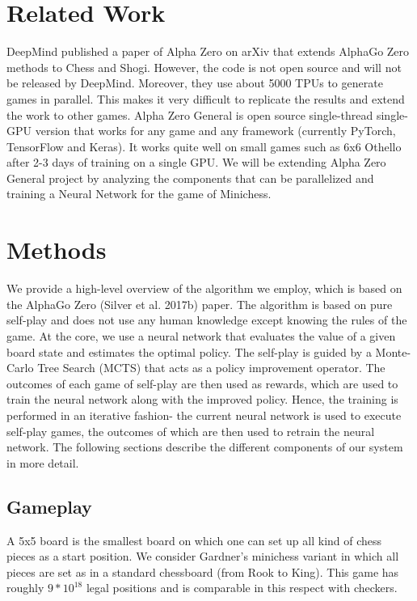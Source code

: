\documentclass[11pt]{article}
\begin{document}
\section{Related Work}

DeepMind published a ​paper​ of Alpha Zero on arXiv that extends AlphaGo Zero methods to Chess and Shogi. However, the code is not open source and will not be released by DeepMind. Moreover, they use about 5000 TPUs to generate games in parallel. This makes it very difficult to replicate the results and extend the work to other games. ​Alpha Zero General​ is open source single-thread single-GPU version that works for any game and any framework (currently PyTorch, TensorFlow and Keras). It works quite well on small games such as 6x6 Othello after ​2-3 days of training on a single GPU​. We will be extending Alpha Zero General project by analyzing the components that can be parallelized and training a Neural Network for the game of Minichess. 


\section{Methods}

We provide a high-level overview of the algorithm we employ, which is based on the AlphaGo Zero (Silver et al. 2017b) paper. The algorithm is based on pure self-play and does not use any human knowledge except knowing the rules of the game. At the core, we use a neural network that evaluates the value of a given board state and estimates the optimal policy. The self-play is guided by a Monte-Carlo Tree Search (MCTS) that acts as a policy improvement operator. The outcomes of each game of self-play are then used as rewards, which are used to train the neural network along with the improved policy. Hence, the training is performed in an iterative fashion- the current neural network is used to execute self-play games, the outcomes of which are then used to retrain the neural network. The following sections describe the different components of our system in more detail. 

\subsection{Gameplay}

A 5x5 board is the smallest board on which one can set up all kind of chess pieces as a start position. We consider Gardner's minichess variant in which all pieces are set as in a standard chessboard (from Rook to King). This game has roughly $9 * 10^{18}$ legal positions \cite{gardner} and is comparable in this respect with checkers.
\end{document}
